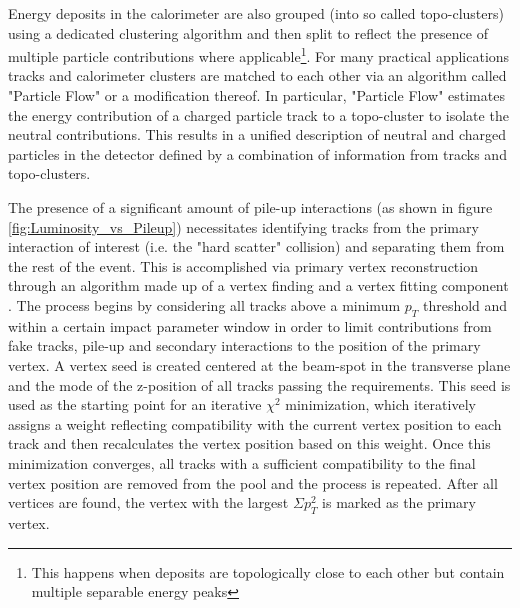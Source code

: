 Energy deposits in the calorimeter are also grouped (into so called topo-clusters) using a dedicated clustering 
algorithm and then split to reflect the presence of multiple particle contributions where applicable\footnote{This 
happens when deposits are topologically close to each other but contain multiple separable energy peaks}. For many 
practical applications tracks and calorimeter clusters are matched to each other via an algorithm called "Particle 
Flow" \cite{atlas-pflow} or a modification thereof. In particular, "Particle Flow" estimates the energy contribution 
of a charged particle track to a topo-cluster to isolate the neutral contributions. This results in a unified 
description of neutral and charged particles in the detector defined by a combination of information from tracks and 
topo-clusters. \par

The presence of a significant amount of pile-up interactions (as shown in figure \ref{fig:Luminosity_vs_Pileup}) 
necessitates identifying tracks from the primary interaction of interest (i.e. the "hard scatter" collision) and 
separating them from the rest of the event. This is accomplished via primary vertex reconstruction through an 
algorithm made up of a vertex finding and a vertex fitting component \cite{atlas-vertex-reconstruction}. The 
process begins by considering all tracks above a minimum $p_T$ threshold and within a certain impact parameter 
window in order to limit contributions from fake tracks, pile-up and secondary interactions to the position of 
the primary vertex. A vertex seed is created centered at the beam-spot in the transverse plane and the mode of the 
z-position of all tracks passing the requirements. This seed is used as the starting point for an iterative $\chi^2$ 
minimization, which iteratively assigns a weight reflecting compatibility with the current vertex position to each 
track and then recalculates the vertex position based on this weight. Once this minimization converges, all tracks 
with a sufficient compatibility to the final vertex position are removed from the pool and the process is repeated. 
After all vertices are found, the vertex with the largest $\Sigma p_T^2$ is marked as the primary vertex. \par


